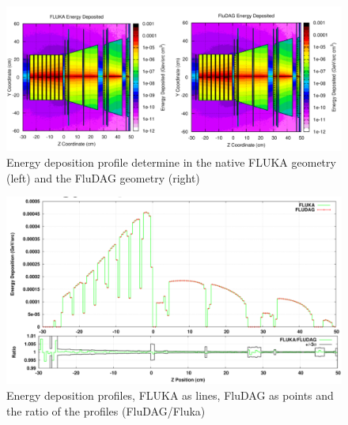 \begin{figure}[ht!]
 \begin{centering}
 \centering
 \includegraphics[width=0.7\paperwidth]{../figs/atic_energy_deposition.png}
 \caption{Energy deposition profile determine in the native FLUKA geometry (left) and the FluDAG geometry (right)}
 \label{fig:atic_energy_deposition}
 \end{centering}
\end{figure}
\begin{figure}[ht!]
 \begin{centering}
 \centering
 \includegraphics[width=0.7\paperwidth]{../figs/atic_energy_deposition_lineout.png}
 \caption{Energy deposition profiles, FLUKA as lines, FluDAG as points and the ratio of the profiles (FluDAG/Fluka)}
 \label{fig:atic_energy_deposition_lineout}
 \end{centering}
\end{figure}

